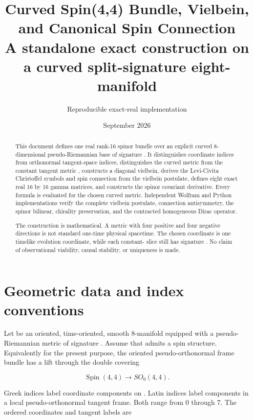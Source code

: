 \documentclass[11pt]{article}
\title{Curved Spin(4,4) Bundle, Vielbein, and Canonical Spin Connection\\[0.5em]\large A standalone exact construction on a curved split-signature eight-manifold}
\author{Reproducible exact-real implementation}
\date{September 2026}
\begin{document}
\maketitle
\tableofcontents
\newpage
\begin{abstract}
This document defines one real rank-16 spinor bundle over an explicit curved 8-dimensional pseudo-Riemannian base of signature \texttt{}. It distinguishes coordinate indices from orthonormal tangent-space indices, distinguishes the curved metric \texttt{} from the constant tangent metric \texttt{}, constructs a diagonal vielbein, derives the Levi-Civita Christoffel symbols and spin connection from the vielbein postulate, defines eight exact real 16 by 16 gamma matrices, and constructs the spinor covariant derivative. Every formula is evaluated for the chosen curved metric. Independent Wolfram and Python implementations verify the complete vielbein postulate, connection antisymmetry, the spinor bilinear, chirality preservation, and the contracted homogeneous Dirac operator.

The construction is mathematical. A metric with four positive and four negative directions is not standard one-time physical spacetime. The chosen coordinate \texttt{} is one timelike evolution coordinate, while each constant-\texttt{} slice still has signature \texttt{}. No claim of observational viability, causal stability, or uniqueness is made.

\end{abstract}

\section{Geometric data and index conventions}

Let \texttt{} be an oriented, time-oriented, smooth 8-manifold equipped with a pseudo-Riemannian metric \texttt{} of signature \texttt{}. Assume that \texttt{} admits a spin structure. Equivalently for the present purpose, the oriented pseudo-orthonormal frame bundle has a lift through the double covering

\[
\operatorname{Spin}(4,4)\longrightarrow SO_0(4,4).
\]

Greek indices \texttt{} label coordinate components on \texttt{}. Latin indices \texttt{} label components in a local pseudo-orthonormal tangent frame. Both range from 0 through 7. The ordered coordinates and tangent labels are
\end{document}
